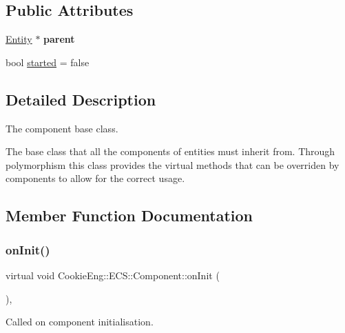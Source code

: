 \subsection*{Public Attributes}
\begin{DoxyCompactItemize}
\item 
\mbox{\label{class_cookie_eng_1_1_e_c_s_1_1_component_a8a0c5a4ee3a87809d3e6d0bdaed3ebbe}} 
\hyperlink{class_cookie_eng_1_1_e_c_s_1_1_entity}{Entity} $\ast$ {\bfseries parent}
\item 
bool \hyperlink{class_cookie_eng_1_1_e_c_s_1_1_component_aa7129172e0881ed80dbc6256570ad998}{started} = false
\end{DoxyCompactItemize}


\subsection{Detailed Description}
The component base class. 

The base class that all the components of entities must inherit from. Through polymorphism this class provides the virtual methods that can be overriden by components to allow for the correct usage. 

\subsection{Member Function Documentation}
\mbox{\label{class_cookie_eng_1_1_e_c_s_1_1_component_a4b02b630558005a9c4723cf15b8b03d6}} 
\subsubsection{\texorpdfstring{on\+Init()}{onInit()}}
{\footnotesize\ttfamily virtual void Cookie\+Eng\+::\+E\+C\+S\+::\+Component\+::on\+Init (\begin{DoxyParamCaption}{ }\end{DoxyParamCaption})\hspace{0.3cm}{\ttfamily [inline]}, {\ttfamily [virtual]}}



Called on component initialisation. 

